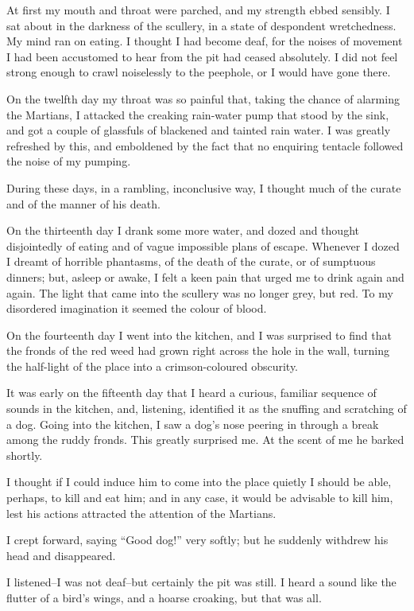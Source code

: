 At first my mouth and throat were parched, and my strength ebbed
sensibly. I sat about in the darkness of the scullery, in a state
of despondent wretchedness. My mind ran on eating. I thought I had
become deaf, for the noises of movement I had been accustomed to
hear from the pit had ceased absolutely. I did not feel strong
enough to crawl noiselessly to the peephole, or I would have gone
there.

On the twelfth day my throat was so painful that, taking the chance
of alarming the Martians, I attacked the creaking rain-water pump
that stood by the sink, and got a couple of glassfuls of blackened
and tainted rain water. I was greatly refreshed by this, and
emboldened by the fact that no enquiring tentacle followed the
noise of my pumping.

During these days, in a rambling, inconclusive way, I thought much
of the curate and of the manner of his death.

On the thirteenth day I drank some more water, and dozed and
thought disjointedly of eating and of vague impossible plans of
escape. Whenever I dozed I dreamt of horrible phantasms, of the
death of the curate, or of sumptuous dinners; but, asleep or awake,
I felt a keen pain that urged me to drink again and again. The
light that came into the scullery was no longer grey, but red. To
my disordered imagination it seemed the colour of blood.

On the fourteenth day I went into the kitchen, and I was surprised
to find that the fronds of the red weed had grown right across the
hole in the wall, turning the half-light of the place into a
crimson-coloured obscurity.

It was early on the fifteenth day that I heard a curious, familiar
sequence of sounds in the kitchen, and, listening, identified it as
the snuffing and scratching of a dog. Going into the kitchen, I saw
a dog's nose peering in through a break among the ruddy fronds.
This greatly surprised me. At the scent of me he barked shortly.

I thought if I could induce him to come into the place quietly I
should be able, perhaps, to kill and eat him; and in any case, it
would be advisable to kill him, lest his actions attracted the
attention of the Martians.

I crept forward, saying ``Good dog!'' very softly; but he suddenly
withdrew his head and disappeared.

I listened--I was not deaf--but certainly the pit was still. I
heard a sound like the flutter of a bird's wings, and a hoarse
croaking, but that was all.

